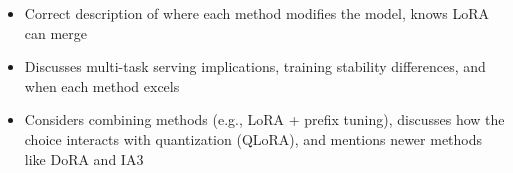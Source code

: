 \begin{interviewq}
\goodgreat
\begin{itemize}
    \item {} Correct description of where each method modifies the model, knows LoRA can merge
    \item {} Discusses multi-task serving implications, training stability differences, and when each method excels
    \item {} Considers combining methods (e.g., LoRA + prefix tuning), discusses how the choice interacts with quantization (QLoRA), and mentions newer methods like DoRA and IA3
\end{itemize}

\end{interviewq}

